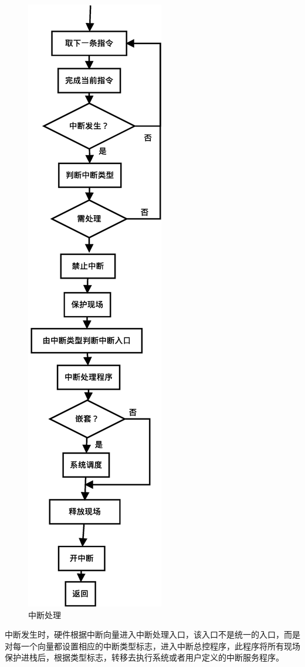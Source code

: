 \documentclass[UTF8,nofonts,cs4size]{ctexrep}
\begin{document}
\begin{figure}[htp]
\centering
\includegraphics[scale=0.4]{interup.eps}
\caption{中断处理}
\label{interup}
\end{figure}
\indent 中断发生时，硬件根据中断向量进入中断处理入口，该入口不是统一的入口，而是对每一个向量都设置相应的中断类型标志，进入中断总控程序，此程序将所有现场保护进栈后，根据类型标志，转移去执行系统或者用户定义的中断服务程序。
\end{document}
